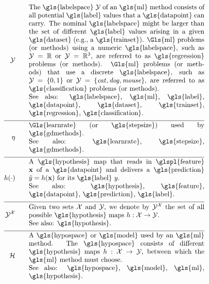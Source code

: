 \begin{align}
	\labelspace  \quad\quad & \parbox{.75\textwidth}{The \gls{labelspace} $\labelspace$ of 
		an \gls{ml} method consists of all potential \gls{label} values that a \gls{datapoint} can 
		carry. The nominal \gls{labelspace} might be larger than the set of different \gls{label} 
		values arising in a given \gls{dataset} (e.g., a \gls{trainset}). \Gls{ml} problems 
		(or methods) using a numeric \gls{labelspace}, such as $\labelspace=\mathbb{R}$ 
		or $\labelspace=\mathbb{R}^{3}$, are referred to as \gls{regression} problems (or methods). \Gls{ml} 
		problems (or methods) that use a discrete \gls{labelspace}, such as $\labelspace=\{0,1\}$ or $\labelspace=\{\mbox{\emph{cat}},\mbox{\emph{dog}},\mbox{\emph{mouse}}\}$, 
		are referred to as \gls{classification} problems (or methods).
		\\ See also: \gls{labelspace}, \gls{ml}, \gls{label}, \gls{datapoint},  \gls{dataset}, \gls{trainset}, 
		\gls{regression}, \gls{classification}.}  \nonumber \\[2mm] \hline \nonumber\\[-5mm]
	\lrate  \quad\quad & \parbox{.75\textwidth}{\Gls{learnrate} (or \gls{stepsize}) used by \gls{gdmethods}.
		\\ See also: \gls{learnrate}, \gls{stepsize}, \gls{gdmethods}. }  \nonumber \\[2mm] \hline \nonumber\\[-5mm]
	\hypothesis(\cdot)  \quad\quad &\parbox{.75\textwidth}{A \gls{hypothesis} map that reads in \glspl{feature} $\featurevec$ of a \gls{datapoint} 
		and delivers a \gls{prediction} $\hat{\truelabel}=\hypothesis(\featurevec)$ for its \gls{label} $\truelabel$.
		\\ See also: \gls{hypothesis}, \gls{feature}, \gls{datapoint}, \gls{prediction}, \gls{label}. }  	 \nonumber \\[2mm] \hline \nonumber\\[-5mm]
	 \labelspace^{\featurespace} \quad\quad & \parbox{.75\textwidth}{Given two sets $\featurespace$ and $\labelspace$, we denote by $ \labelspace^{\featurespace}$ 
	 	the set of all possible \gls{hypothesis} maps $\hypothesis: \featurespace \rightarrow \labelspace$.
		\\ See also: \gls{hypothesis}. } 	 \nonumber \\[2mm] \hline \nonumber\\[-5mm]
	\hypospace  \quad\quad & \parbox{.75\textwidth}{A \gls{hypospace} or \gls{model} used by an \gls{ml} method. 
		The \gls{hypospace} consists of different \gls{hypothesis} maps $\hypothesis: \featurespace \rightarrow \labelspace$, between which 
		the \gls{ml} method must choose.
		\\ See also: \gls{hypospace}, \gls{model}, \gls{ml}, \gls{hypothesis}. }   \nonumber 
\end{align}     

